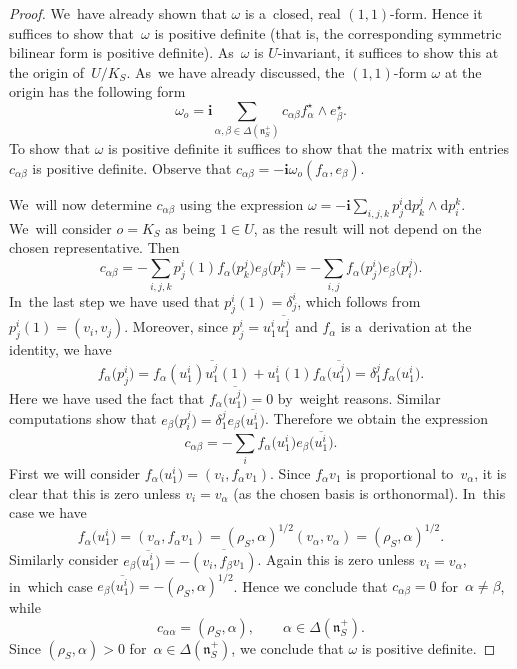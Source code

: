 \documentclass[pdftex]{sigma}
\numberwithin{equation}{section}
\newcommand{\lien}{\mathfrak{n}}
\newcommand{\diff}{\mathrm{d}}
\newcommand{\iu}{\boldsymbol{i}}
\newcommand{\kafo}{\omega}
\newcommand{\homroot}{\Delta(\lien_S^+)}
\begin{document}
\begin{proof}
We~have already shown that $\kafo$ is a~closed, real $(1, 1)$-form.
Hence it suffices to show that~$\kafo$ is positive definite (that is, the corresponding symmetric bilinear form is positive definite).
As~$\kafo$ is $U$-invariant, it suffices to show this at the origin of~$U / K_S$.
As~we have already discussed, the $(1, 1)$-form $\kafo$ at the origin has the following form
\[
\kafo_o = \iu \sum_{\alpha, \beta \in \homroot} c_{\alpha \beta} f_\alpha^\star \wedge e_\beta^\star.
\]
To show that $\kafo$ is positive definite it suffices to show that the matrix with entries $c_{\alpha \beta}$ is positive definite.
Observe that $c_{\alpha \beta} = - \iu \kafo_o(f_\alpha, e_\beta)$.

We~will now determine $c_{\alpha \beta}$ using the expression $\kafo = - \iu \sum_{i, j, k} p^i_j \diff p^j_k \wedge \diff p^k_i$.
We~will consider $o = K_S$ as being $1 \in U$, as the result will not depend on the chosen representative. Then
\[
c_{\alpha \beta} = - \sum_{i, j, k} p^i_j(1) f_\alpha\big(p^j_k\big) e_\beta\big(p^k_i\big)
= - \sum_{i, j} f_\alpha\big(p^i_j\big) e_\beta\big(p^j_i\big).
\]
In~the last step we have used that $p^i_j(1) = \delta^i_j$, which follows from $p^i_j(1) = (v_i, v_j)$.
Moreover, since $p^i_j = u^i_1 \overline{u^j_1}$ and $f_\alpha$ is a~derivation at the identity, we have
\[
f_\alpha\big(p^i_j\big) = f_\alpha(u^i_1) \overline{u^j_1}(1) + u^i_1(1) f_\alpha\big(\overline{u^j_1}\big)
= \delta^j_1 f_\alpha\big(u^i_1\big).
\]
Here we have used the fact that $f_\alpha\big(\overline{u^j_1}\big) = 0$ by~weight reasons.
Similar computations show that $e_\beta\big(p^j_i\big) = \delta^j_1 e_\beta\big(\overline{u^i_1}\big)$.
Therefore we obtain the expression
\[
c_{\alpha \beta} = - \sum_i f_\alpha\big(u^i_1\big) e_\beta\big(\overline{u^i_1}\big).
\]
First we will consider $f_\alpha\big(u^i_1\big) = (v_i, f_\alpha v_1)$.
Since $f_\alpha v_1$ is proportional to~$v_\alpha$, it is clear that this is zero unless $v_i = v_\alpha$ (as the chosen basis is orthonormal).
In~this case we have
\[
f_\alpha\big(u^i_1\big) = (v_\alpha, f_\alpha v_1) = (\rho_S, \alpha)^{1/2} (v_\alpha, v_\alpha) = (\rho_S, \alpha)^{1/2}.
\]
Similarly consider $e_\beta\big(\overline{u^i_1}\big) = - \overline{(v_i, f_\beta v_1)}$.
Again this is zero unless $v_i = v_\alpha$, in~which case $e_\beta\big(\overline{u^i_1}\big) = -(\rho_S, \alpha)^{1/2}$.
Hence we conclude that $c_{\alpha \beta} = 0$ for~$\alpha \neq \beta$, while
\[
c_{\alpha \alpha} = (\rho_S, \alpha), \qquad \alpha \in \homroot.
\]
Since $(\rho_S, \alpha) > 0$ for~$\alpha \in \homroot$, we conclude that $\kafo$ is positive definite.
\end{proof}
\end{document}
